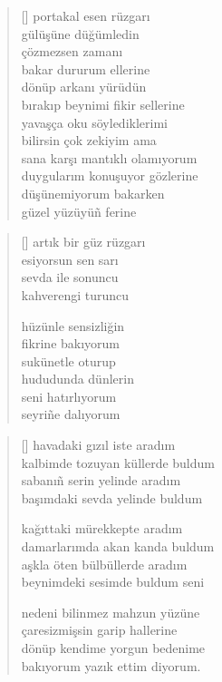 \documentclass[a5paper, openright, twoside]{memoir}
\begin{document}
\begin{verse}[\versewidth]
  portakal esen rüzgarı \\
  gülüşüne düğümledin \\
  çözmezsen zamanı \\
  bakar dururum ellerine \\
  dönüp arkanı yürüdün \\
  bırakıp beynimi fikir sellerine \\
  yavaşça oku söylediklerimi \\
  bilirsin çok zekiyim ama \\
  sana karşı mantıklı olamıyorum \\
  duygularım konuşuyor gözlerine \\
  düşünemiyorum bakarken \\
  güzel yüzüyü\~n ferine
\end{verse}
\begin{verse}[\versewidth]
  artık bir güz rüzgarı \\
  esiyorsun sen sarı \\
  sevda ile sonuncu \\
  kahverengi turuncu

  hüzünle sensizliğin \\
  fikrine bakıyorum \\
  sukünetle oturup \\
  hududunda dünlerin \\
  seni hatırlıyorum \\
  seyri\~ne dalıyorum
\end{verse}
\begin{verse}[\versewidth]
  havadaki gızıl iste aradım \\
  kalbimde tozuyan küllerde buldum \\
  sabanı\~n serin yelinde aradım \\
  başımdaki sevda yelinde buldum

  kağıttaki mürekkepte aradım \\
  damarlarımda akan kanda buldum \\
  aşkla öten bülbüllerde aradım \\
  beynimdeki sesimde buldum seni

  nedeni bilinmez mahzun yüzüne \\
  çaresizmişsin garip hallerine \\
  dönüp kendime yorgun bedenime \\
  bakıyorum yazık ettim diyorum.
\end{verse}
\end{document}
